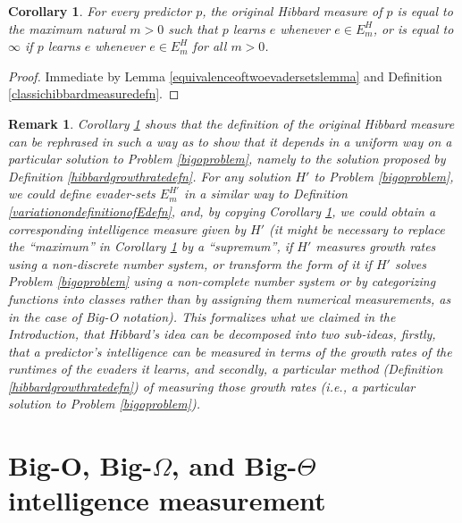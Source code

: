 \documentclass{article}
\newtheorem{corollary}[theorem]{Corollary}
\newtheorem{remark}[theorem]{Remark}
\begin{document}
\begin{corollary}
\label{rephrasinghibbardsmeasurecorollary}
    For every predictor $p$, the original Hibbard measure of $p$
    is equal to the maximum natural $m>0$ such that
    $p$ learns $e$ whenever $e\in E^H_m$, or is equal to $\infty$
    if $p$ learns $e$ whenever $e\in E^H_m$ for all $m>0$.
\end{corollary}

\begin{proof}
    Immediate by Lemma \ref{equivalenceoftwoevadersetslemma}
    and Definition \ref{classichibbardmeasuredefn}.
\end{proof}

\begin{remark}
\label{epiphanyremark}
Corollary \ref{rephrasinghibbardsmeasurecorollary} shows that
the definition of the original Hibbard measure can be rephrased in such a way
as to show that it depends in a uniform way on a particular solution to
Problem \ref{bigoproblem}, namely to the solution proposed by
Definition \ref{hibbardgrowthratedefn}. For \emph{any} solution $H'$ to
Problem \ref{bigoproblem}, we could define evader-sets $E^{H'}_m$ in a similar
way to Definition \ref{variationondefinitionofEdefn}, and, by copying
Corollary \ref{rephrasinghibbardsmeasurecorollary}, we could obtain a corresponding
intelligence measure given by $H'$ (it might be necessary to replace the
``maximum'' in Corollary \ref{rephrasinghibbardsmeasurecorollary}
by a ``supremum'', if $H'$ measures growth rates using
a non-discrete number system, or transform the form of it if $H'$
solves Problem \ref{bigoproblem} using a non-complete number system or
by categorizing functions into classes
rather than by assigning
them numerical measurements, as in the case of Big-O notation). This
formalizes what we claimed in the Introduction,
that Hibbard's idea can be decomposed into two sub-ideas, firstly, that a predictor's
intelligence can be measured in terms of the growth rates of the runtimes of the
evaders it learns, and secondly, a particular method (Definition \ref{hibbardgrowthratedefn})
of measuring those growth rates (i.e., a particular solution to
Problem \ref{bigoproblem}).
\end{remark}


\section{Big-O, Big-$\Omega$, and Big-$\Theta$ intelligence measurement}
\label{bigosection}
\end{document}
